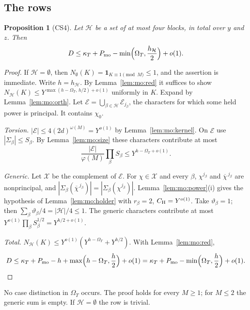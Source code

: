 \documentclass{amsart}
\newtheorem{proposition}[lemma]{Proposition}
\theoremstyle{definition}
\theoremstyle{plain}
\numberwithin{equation}{section}
\numberwithin{table}{section}
\begin{document}
\subsection{The rows}\label{sec:mo:rows}

\begin{proposition}[CS4]\label{prop:mo:CS4}
Let $\mathcal H$ be a set of at most four blocks, in total over $y$ and $z$.
Then
\begin{equation}\label{eq:mo:CS4}
 D\le \kappa_T+P_{\rm mo}-\min\Bigl(\Omega_T,\frac{h_{\mathcal H}}2\Bigr)+o(1).
\end{equation}
\end{proposition}

\begin{proof}
If $\mathcal H=\emptyset$, then
$N_{\emptyset}(K)=\mathbf 1_{K\equiv1\pmod M}\le1$, and the assertion is
immediate. Write $h=h_{\mathcal H}$. By Lemma~\ref{lem:mo:red} it suffices to
show $N_{\mathcal H}(K)\le Y^{\max(h-\Omega_T,\,h/2)+o(1)}$ uniformly in $K$.
Expand by Lemma~\ref{lem:mo:orth}. Let
$\mathcal E=\bigcup_{\beta\in\mathcal H}\mathcal E_{j_\beta}$, the characters
for which some held power is principal. It contains $\chi_0$.

\emph{Torsion.} $|\mathcal E|\le4(2d)^{\omega(M)}=Y^{o(1)}$ by
Lemma~\ref{lem:mo:kernel}. On $\mathcal E$ use $|\Sigma_\beta|\le S_\beta$. By
Lemma~\ref{lem:mo:size} these characters contribute at most
\[
 \frac{|\mathcal E|}{\varphi(M)}\prod_\beta S_\beta\le Y^{h-\Omega_T+o(1)} .
\]

\emph{Generic.} Let $\mathcal X$ be the complement of $\mathcal E$. For
$\chi\in\mathcal X$ and every $\beta$, $\chi^{j_\beta}$ and
$\overline\chi^{\,j_\beta}$ are nonprincipal, and
$|\Sigma_\beta(\overline\chi^{\,j_\beta})|=|\Sigma_\beta(\chi^{j_\beta})|$. Lemma~\ref{lem:mo:power}(i)
gives the hypothesis of Lemma~\ref{lem:mo:holder} with $r_\beta=2$,
 $C_{\rm H}=Y^{o(1)}$. Take $\vartheta_\beta=1$; then
$\sum_\beta\vartheta_\beta/4=|\mathcal H|/4\le1$. The generic characters
contribute at most $Y^{o(1)}\prod_\beta S_\beta^{1/2}=Y^{h/2+o(1)}$.

\emph{Total.} $N_{\mathcal H}(K)\le Y^{o(1)}(Y^{h-\Omega_T}+Y^{h/2})$. With
Lemma~\ref{lem:mo:red},
\[
 D\le \kappa_T+P_{\rm mo}-h+\max\Bigl(h-\Omega_T,\frac h2\Bigr)+o(1)
 =\kappa_T+P_{\rm mo}-\min\Bigl(\Omega_T,\frac h2\Bigr)+o(1).
\]
\end{proof}

No case distinction in $\Omega_T$ occurs. The proof holds for every $M\ge1$; for
$M\le2$ the generic sum is empty. If $\mathcal H=\emptyset$ the row is
trivial.
\end{document}
